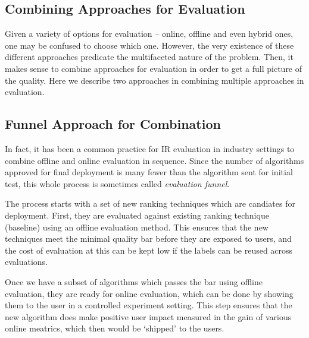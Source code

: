 \subsection{Combining Approaches for Evaluation}

Given a variety of options for evaluation -- online, offline and even hybrid ones, one may be confused to choose which one. However, the very existence of these different approaches predicate the multifaceted nature of the problem. Then, it makes sense to combine approaches for evaluation in order to get a full picture of the quality. Here we describe two approaches in combining multiple approaches in evaluation.  %


\subsection{Funnel Approach for Combination}
In fact, it has been a common practice for IR evaluation in industry settings to combine offline and online evaluation in sequence. Since the number of algorithms approved for final deployment is many fewer than the algorithm sent for initial test, this whole process is sometimes called \textit{evaluation funnel}. 

The process starts with a set of new ranking techniques which are candiates for deployment. First, they are evaluated against existing ranking technique (baseline) using an offline evaluation method. This ensures that the new techniques meet the minimal quality bar before they are exposed to users, and the cost of evaluation at this can be kept low if the labels can be reused across evaluations.

Once we have a subset of algorithms which passes the bar using offline evaluation, they are ready for online evaluation, which can be done by showing them to the user in a controlled experiment setting. This step ensures that the new algorithm does make positive user impact measured in the gain of various online meatrics, which then would be `shipped' to the users. 

